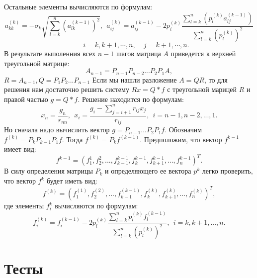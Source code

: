 \documentclass[14pt, titlepage,fleqn]{extarticle}
\begin{document}
	Остальные элементы вычисляются по формулам:
	\[a^{(k)}_{kk} = -\sigma_k \sqrt{\sum^{n}_{l=k}(a^{(k-1)}_{lk})^2}, ~~ a^{(k)}_{ij} = a^{(k-1)}_{ij} - 2p^{(k)}_{i} \dfrac{\sum^{n}_{l=k}(p^{(k)}_{l}a^{(k-1)}_{lj})}{\sum^{n}_{l=k}(p^{(k)}_{l})^2}\]
	\[~~~~~~~~~i = k, k+1, \cdots, n,~~~~~j=k+1,\cdots,n.\]
	\newpage
	В результате выполенния всех $n-1$ шагов матрица $A$ приведется к верхней треугольной матрице:
	\[A_{n-1} = P_{n-1}P_{n-2}...P_2P_1A,\]
	$R = A_{n-1}, Q = P_1P_2...P_{n-1}$
	Если мы нашли разложение $A = QR$, то для решения нам достаточно решить систему $Rx= Q*f$ с треугольной марицей $R$ и правой частью $g=Q*f$. Решение находится по формулам:
	\[x_n = \dfrac{g_n}{r_{nn}},~~ x_i = \dfrac{g_i - \sum^{n}_{j=i+1}r_{ij}x_j}{r_{ij}}, ~~i = n-1, n-2,...,1.\]
	Но сначала надо вычислить вектор $g = P_{n-1}...P_2P_1f.$ Обозначим $f^{(k)} = P_kP_{k-1}P_1f.$ Тогда $f^{(k)} = P_kf^{(k-1)}.$ Предположим, что вектор $f^{k-1}$ имеет вид:
	\[f^{k-1} = (f^{1}_{1}, f^{2}_{2},...,f^{k-1}_{k-1},f^{k-1}_{k},f^{k-1}_{k+1},...,f^{k-1}_{n})^T.\]
	В силу определения матрицы $P_k$ и определяющего ее вектора $p^k$ легко проверить, что вектор $f^k$ будет иметь вид:
	\[f^{(k)} = (f^{(1)}_{1}, f^{(2)}_{2}, ..., f^{(k-1)}_{k-1}, f^{(k)}_{k}, f^{(k)}_{k+1},...,f^{(k)}_{n})^T,\]
	где элементы $f^k_i$ вычисляются по формулам:
	\[f^{(k)}_{i} = f^{(k - 1)}_{i} - 2p^{(k)}_{l} \dfrac{\sum^{n}_{l=k}p^{(k)}_{l}f^{(k-1)}_{l}}{\sum^{n}_{l=k}(p^{(k)}_{l})^2},~~ i = k,k+1,...,n.\]
	\newpage
	\section*{Тесты}
\end{document}
